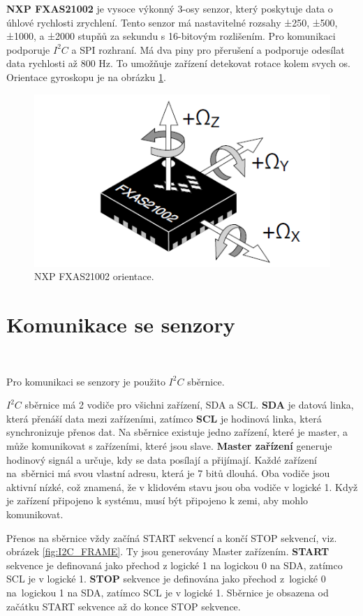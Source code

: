 \textbf{NXP FXAS21002} je vysoce výkonný 3-osy senzor, který poskytuje data o úhlové rychlosti
zrychlení. Tento senzor má nastavitelné rozsahy ±250, ±500, ±1000, a
±2000 stupňů za sekundu
s 16-bitovým rozlišením. Pro komunikaci podporuje $I^2C$ a SPI rozhraní.
Má dva piny pro přerušení a podporuje odesílat data rychlosti až 800 Hz.
To umožňuje zařízení detekovat rotace kolem svych os.
Orientace gyroskopu je na obrázku \ref{fig:FXAS_Orientation}\cite{FXAS21002}.

\begin{figure}[!h]
    \centering
    \includegraphics[width = 0.5\linewidth]{Figures/FXAS_Orientation.png}
    \caption{NXP FXAS21002 orientace\cite{FXAS21002}.}
    \label{fig:FXAS_Orientation}
\end{figure}

\section{Komunikace se senzory}\

Pro komunikaci se senzory je použito $I^2C$ sběrnice.

$I^2C$ sběrnice má 2 vodiče pro všichni zařízení, SDA a SCL.
\textbf{SDA} je datová linka, která
přenáší data mezi zařízeními, zatímco \textbf{SCL} je hodinová linka, která synchronizuje
přenos dat. Na sběrnice existuje jedno zařízení, které je master, a může komunikovat
s zařízeními, které jsou slave. \textbf{Master zařízení} generuje hodinový signál a
určuje, kdy se data posílají a přijímají. Každé zařízení na~sběrnici má svou
vlastní adresu, která je 7 bitů dlouhá. Oba vodiče jsou aktivní nízké, což znamená,
že v klidovém stavu jsou oba vodiče v logické 1. Když je zařízení připojeno k
systému, musí být připojeno k zemi, aby mohlo komunikovat.

Přenos na sběrnice vždy začíná START sekvencí a končí STOP sekvencí,
viz. obrázek \ref{fig:I2C_FRAME}. Ty jsou generovány Master zařízením.
\textbf{START} sekvence je definovaná jako přechod z logické 1 na logickou 0 na SDA, zatímco
SCL je v logické 1. \textbf{STOP} sekvence je definována jako přechod z~logické 0 na~logickou 1 na SDA, zatímco SCL je v logické 1. Sběrnice je obsazena od začátku START sekvence
až do konce STOP sekvence.

